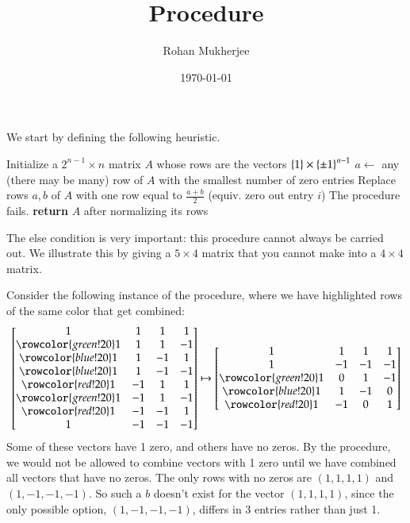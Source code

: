 \documentclass[12pt]{article}
\title{Procedure}
\date{\today}
\author{Rohan Mukherjee}
\theoremstyle{definitionstyle}
\newcommand{\SET}[1]{\Set{\mskip-\medmuskip #1 \mskip-\medmuskip}}
\begin{document}
    \maketitle
    
    We start by defining the following heuristic.
\begin{algorithmic}
        \State Initialize a $2^{n-1} \times n$ matrix $A$ whose rows are the vectors $\SET{1} \times \SET{\pm 1}^{n-1}$
            \State $a\gets$ any (there may be many) row of $A$ with the smallest number of zero entries
                \State Replace rows $a,b$ of $A$ with one row equal to $\frac{a+b}2$ (equiv. zero out entry $i$)
            \Else
                \State The procedure fails.
            \EndIf
        \EndWhile
        \State \textbf{return} $A$ after normalizing its rows
    \EndProcedure
\end{algorithmic}

The else condition is very important: this procedure cannot always be carried out. We illustrate this by giving a $5 \times 4$ matrix that you cannot make into a $4 \times 4$ matrix. 

Consider the following instance of the procedure, where we have highlighted rows of the same color that get combined:
\begin{align}
    \begin{bmatrix}
        1 & 1 & 1 & 1 \\
        \rowcolor{green!20} 1 & 1 & 1 & -1 \\
        \rowcolor{blue!20} 1 & 1 & -1 & 1 \\
        \rowcolor{blue!20}  1 & 1 & -1 & -1 \\
        \rowcolor{red!20} 1 & -1 & 1 & 1 \\
        \rowcolor{green!20} 1 & -1 & 1 & -1 \\
        \rowcolor{red!20}1 & -1 & -1 & 1 \\
        1 & -1 & -1 & -1
    \end{bmatrix} \mapsto 
    \begin{bmatrix}
        1 & 1 & 1 & 1 \\
        1 & -1 & -1 & -1 \\
        \rowcolor{green!20} 1 & 0 & 1 & -1 \\
        \rowcolor{blue!20} 1 & 1 & -1 & 0 \\
        \rowcolor{red!20} 1 & -1 & 0 & 1
    \end{bmatrix}
\end{align}
Some of these vectors have 1 zero, and others have no zeros. By the procedure, we would not be allowed to combine vectors with 1 zero until we have combined all vectors that have no zeros. The only rows with no zeros are $(1, 1, 1, 1)$ and $(1, -1, -1, -1)$. So such a $b$ doesn't exist for the vector $(1, 1, 1, 1)$, since the only possible option, $(1, -1, -1, -1)$, differs in 3 entries rather than just 1. 
\end{document}
